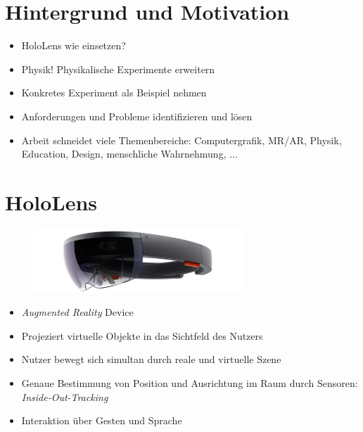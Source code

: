 \part{Hintergrund und Motivation}
\label{part:intro}

\begin{frame}[fragile]{}
\begin{itemize}
	\item HoloLens wie einsetzen?
	\pause
	\item Physik! Physikalische Experimente erweitern
	\pause
	\item Konkretes Experiment als Beispiel nehmen
	\item Anforderungen und Probleme identifizieren und lösen
	\pause
	\item Arbeit schneidet viele Themenbereiche: Computergrafik, MR/AR, Physik, Education, Design, menschliche Wahrnehmung, ... 
\end{itemize}
 
\end{frame}

\part{HoloLens}
\label{part:hololens}
\begin{frame}[fragile]{}
\begin{figure}[h!]
	\centering
	\includegraphics[width=0.7\textwidth]{images/papers/hololens.jpg}
\end{figure}
\begin{itemize}
	\pause
	\item \textit{Augmented Reality} Device
	\pause
	\item Projeziert virtuelle Objekte in das Sichtfeld des Nutzers
	\pause
	\item Nutzer bewegt sich simultan durch reale und virtuelle Szene
	\pause
	\item Genaue Bestimmung von Position und Ausrichtung im Raum durch Sensoren: \textit{Inside-Out-Tracking}
	\pause
	\item Interaktion über Gesten und Sprache
\end{itemize}	
\end{frame}

